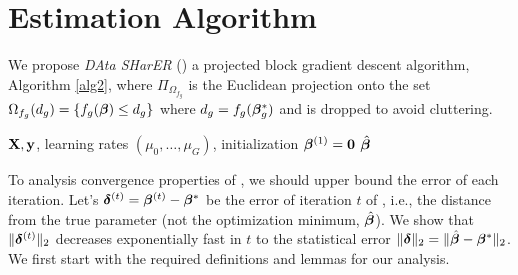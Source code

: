 
\section{Estimation Algorithm}
\label{sec:opt}
We propose \emph{DAta SHarER} (\dc) a projected block gradient descent algorithm, Algorithm \ref{alg2}, where $\Pi_{\Omega_{f_g}}$ is the Euclidean projection onto the set $\Omega_{f_g}(d_g) = \{f_g(\boldsymbol{\beta}) \leq d_g\}$ where $d_g = f_g(\boldsymbol{\beta}_g^*)$ and is dropped to avoid cluttering. %

\begin{algorithm}[t]
	\caption{  \dc }
	\label{alg2}
	\begin{algorithmic}[1]
		 $\mathbf{X}, \mathbf{y}$, learning rates $(\mu_0, \dots, \mu_G)$, initialization $\boldsymbol{\beta} ^{(1)} = \mathbf{0}$
		 $\hat{\boldsymbol{\beta}}$
		\ENDFOR
		\ENDFOR
	\end{algorithmic}
\end{algorithm}

To analysis convergence properties of \dc, we should upper bound the error of each iteration.
Let's $\boldsymbol{\delta}^{(t)} = \boldsymbol{\beta}^{(t)} - \boldsymbol{\beta}^*$ be the error of  iteration $t$ of \dc, i.e., the distance from the true parameter (not the optimization minimum, $\hat{\boldsymbol{\beta}}$). We show that $\|\boldsymbol{\delta}^{(t)}\|_{2}$ decreases exponentially fast in $t$ to the statistical error $\|\boldsymbol{\delta}\|_{2} = \|\hat{\boldsymbol{\beta}} - \boldsymbol{\beta}^*\|_{2}$. We first start with the required definitions and lemmas for our analysis.

